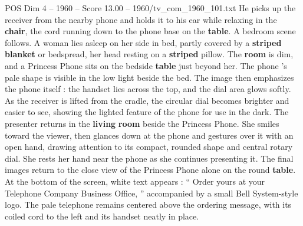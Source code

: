 \begin{textsample}{POS Dim 4 – 1960 – Score 13.00 – 1960/tv\_com\_1960\_101.txt}
He picks up the receiver from the nearby phone and holds it to his ear while relaxing in the \textbf{chair}, the cord running down to the phone base on the \textbf{table}.
A bedroom scene follows.
A woman lies asleep on her side in bed, partly covered by a \textbf{striped} \textbf{blanket} or bedspread, her head resting on a \textbf{striped} pillow.
The \textbf{room} is dim, and a Princess Phone sits on the bedside \textbf{table} just beyond her.
The phone ’s pale shape is visible in the low light beside the bed.
The image then emphasizes the phone itself : the handset lies across the top, and the dial area glows softly.
As the receiver is lifted from the cradle, the circular dial becomes brighter and easier to see, showing the lighted feature of the phone for use in the dark.
The presenter returns in the \textbf{living} \textbf{room} beside the Princess Phone.
She smiles toward the viewer, then glances down at the phone and gestures over it with an open hand, drawing attention to its compact, rounded shape and central rotary dial.
She rests her hand near the phone as she continues presenting it.
The final images return to the close view of the Princess Phone alone on the round \textbf{table}.
At the bottom of the screen, white text appears : “ Order yours at your Telephone Company Business Office, ” accompanied by a small Bell System-style logo.
The pale telephone remains centered above the ordering message, with its coiled cord to the left and its handset neatly in place.

\end{textsample}
